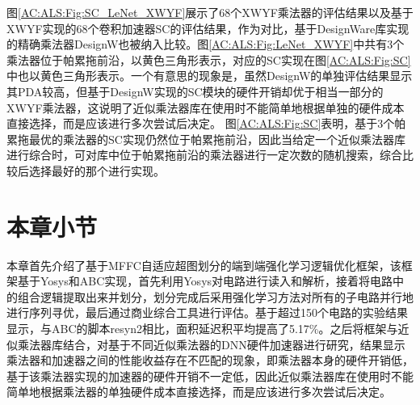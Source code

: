 图\ref{AC:ALS:Fig:SC_LeNet_XWYF}展示了68个XWYF乘法器的评估结果以及基于XWYF实现的68个卷积加速器SC\cite{Accelerator:SC}的评估结果，作为对比，基于DesignWare库\cite{IP:DesignWare}实现的精确乘法器DesignW也被纳入比较。图\ref{AC:ALS:Fig:LeNet_XWYF}中共有3个乘法器位于帕累拖前沿，以黄色三角形表示，对应的SC实现在图\ref{AC:ALS:Fig:SC}中也以黄色三角形表示。一个有意思的现象是，虽然DesignW的单独评估结果显示其PDA较高，但基于DesignW实现的SC模块的硬件开销却优于相当一部分的XWYF乘法器，这说明了近似乘法器库在使用时不能简单地根据单独的硬件成本直接选择，而是应该进行多次尝试后决定。
图\ref{AC:ALS:Fig:SC}表明，基于3个帕累拖最优的乘法器的SC实现仍然位于帕累拖前沿，因此当给定一个近似乘法器库进行综合时，可对库中位于帕累拖前沿的乘法器进行一定次数的随机搜索，综合比较后选择最好的那个进行实现。

\section{本章小节}

本章首先介绍了基于MFFC自适应超图划分的端到端强化学习逻辑优化框架，该框架基于Yosys和ABC实现，首先利用Yosys对电路进行读入和解析，接着将电路中的组合逻辑提取出来并划分，划分完成后采用强化学习方法对所有的子电路并行地进行序列寻优，最后通过商业综合工具进行评估。基于超过150个电路的实验结果显示，与ABC的脚本resyn2相比，面积延迟积平均提高了5.17\%。之后将框架与近似乘法器库结合，对基于不同近似乘法器的DNN硬件加速器进行研究，结果显示乘法器和加速器之间的性能收益存在不匹配的现象，即乘法器本身的硬件开销低，基于该乘法器实现的加速器的硬件开销不一定低，因此近似乘法器库在使用时不能简单地根据乘法器的单独硬件成本直接选择，而是应该进行多次尝试后决定。